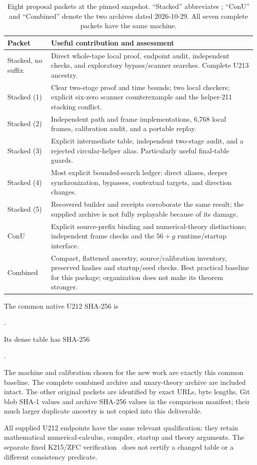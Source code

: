 \begin{table}[htbp]
\centering\small
\begin{tabularx}{\linewidth}{@{}p{26mm}X@{}}
\toprule
Packet & Useful contribution and assessment\\
\midrule
Stacked, no suffix & Direct whole-tape local proof, endpoint audit, independent
checks, and exploratory bypass/scanner searches. Complete U213 ancestry.\\
Stacked (1) & Clear two-stage proof and time bounds; two local checkers;
explicit six-zero scanner counterexample and the helper-211 stacking conflict.\\
Stacked (2) & Independent path and frame implementations, 6,768 local frames,
calibration audit, and a portable replay.\\
Stacked (3) & Explicit intermediate table, independent two-stage audit,
and a rejected circular-helper alias. Particularly useful final-table guards.\\
Stacked (4) & Most explicit bounded-search ledger: direct aliases, deeper
synchronization, bypasses, contextual targets, and direction changes.\\
Stacked (5) & Recovered builder and receipts corroborate the same result;
the supplied archive is not fully replayable because of its damage.\\
ConU & Explicit source-prefix binding and numerical-theory distinctions;
independent frame checks and the $56+g$ runtime/startup interface.\\
Combined & Compact, flattened ancestry, source/calibration inventory,
preserved hashes and startup/seed checks. Best practical baseline for this
package; organization does not make its theorem stronger.\\
\bottomrule
\end{tabularx}
\caption{Eight proposal packets at the pinned snapshot. ``Stacked'' abbreviates
\protect{}; ``ConU'' and ``Combined'' denote the
two archives dated 2026-10-29. All seven complete packets have the same machine.}
\label{tab:comparison}
\end{table}

The common native U212 SHA-256 is
\begin{center}\small
{}.
\end{center}
Its dense table has SHA-256
\begin{center}\small
{}.
\end{center}
The machine and calibration chosen for the new work are exactly this
common baseline. The complete combined archive and unary-theory archive
are included intact. The other original packets are identified by exact
URLs, byte lengths, Git blob SHA-1 values and archive SHA-256 values in the
comparison manifest; their much larger duplicate ancestry is not copied
into this deliverable.

All supplied U212 endpoints have the same relevant qualification: they
retain mathematical numerical-calculus, compiler, startup and theory
arguments. The separate fixed K215/ZFC verification~\cite{k215pa} does not
certify a changed table or a different consistency predicate.
